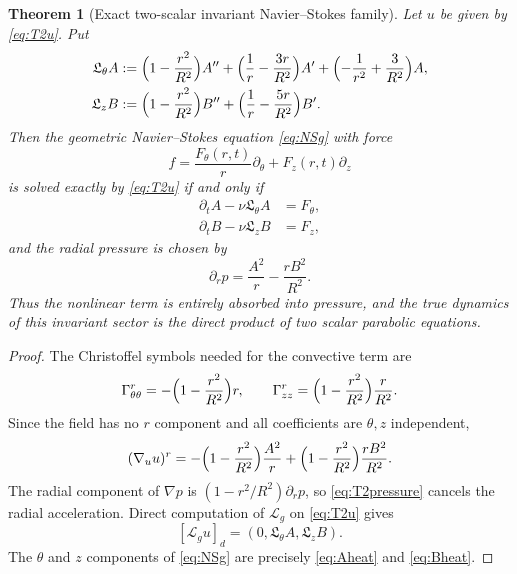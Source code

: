 \documentclass[aps,prd,reprint,superscriptaddress,nofootinbib,floatfix]{revtex4-2}
\newtheorem{theorem}{Theorem}
\theoremstyle{definition}
\theoremstyle{remark}
\newcommand{\cL}{\mathcal{L}}
\begin{document}
\begin{theorem}[Exact two-scalar invariant Navier--Stokes family]\label{thm:T2family}
	Let $u$ be given by \eqref{eq:T2u}.  Put
	\begin{align}
		\mathfrak L_\theta A
		 & :=\Bigl(1-\frac{r^2}{R^2}\Bigr)A''
		+\Bigl(\frac1r-\frac{3r}{R^2}\Bigr)A'
		+\Bigl(-\frac1{r^2}+\frac3{R^2}\Bigr)A,
		\label{eq:LthetaExact}                \\
		\mathfrak L_z B
		 & :=\Bigl(1-\frac{r^2}{R^2}\Bigr)B''
		+\Bigl(\frac1r-\frac{5r}{R^2}\Bigr)B'.
		\label{eq:LzExact}
	\end{align}
	Then the geometric Navier--Stokes equation \eqref{eq:NSg} with force
	\[
		f=\frac{F_\theta(r,t)}{r}\partial_\theta+F_z(r,t)\partial_z
	\]
	is solved exactly by \eqref{eq:T2u} if and only if
	\begin{align}
		\partial_t A-\nu\mathfrak L_\theta A & =F_\theta,\label{eq:Aheat} \\
		\partial_t B-\nu\mathfrak L_z B      & =F_z,\label{eq:Bheat}
	\end{align}
	and the radial pressure is chosen by
	\begin{equation}
		\partial_r p=\frac{A^2}{r}-\frac{rB^2}{R^2}.
		\label{eq:T2pressure}
	\end{equation}
	Thus the nonlinear term is entirely absorbed into pressure, and the true
	dynamics of this invariant sector is the direct product of two scalar parabolic
	equations.
\end{theorem}

\begin{proof}
	The Christoffel symbols needed for the convective term are
	\[
		\Gamma^r_{\theta\theta}=-\Bigl(1-\frac{r^2}{R^2}\Bigr)r,\qquad
		\Gamma^r_{zz}=\Bigl(1-\frac{r^2}{R^2}\Bigr)\frac r{R^2}.
	\]
	Since the field has no $r$ component and all coefficients are $\theta,z$
	independent,
	\[
		(\nabla_u u)^r
		=-\Bigl(1-\frac{r^2}{R^2}\Bigr)\frac{A^2}{r}
		+\Bigl(1-\frac{r^2}{R^2}\Bigr)\frac{rB^2}{R^2}.
	\]
	The radial component of $\nabla p$ is
	$(1-r^2/R^2)\partial_rp$, so \eqref{eq:T2pressure} cancels the radial
	acceleration.  Direct computation of $\cL_g$ on \eqref{eq:T2u} gives
	\[
		[\cL_g u]_d=(0,\mathfrak L_\theta A,\mathfrak L_zB).
	\]
	The $\theta$ and $z$ components of \eqref{eq:NSg} are precisely
	\eqref{eq:Aheat} and \eqref{eq:Bheat}.
\end{proof}
\end{document}
